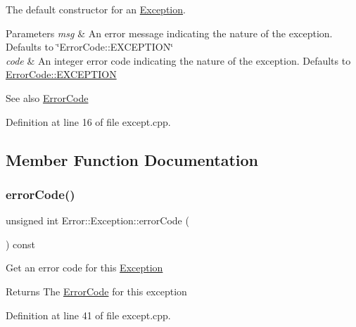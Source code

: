 The default constructor for an \hyperlink{class_error_1_1_exception}{Exception}. 
\begin{DoxyParams}{Parameters}
{\em msg} & An error message indicating the nature of the exception. Defaults to \char`\"{}\+Error\+Code\+::\+E\+X\+C\+E\+P\+T\+I\+O\+N\char`\"{} \\
\hline
{\em code} & An integer error code indicating the nature of the exception. Defaults to \hyperlink{namespace_error_1_1_error_code_ae85b7b550a5a82a4f04d8d5df167f081}{Error\+Code\+::\+E\+X\+C\+E\+P\+T\+I\+ON} \\
\hline
\end{DoxyParams}
\begin{DoxySeeAlso}{See also}
\hyperlink{namespace_error_1_1_error_code}{Error\+Code} 
\end{DoxySeeAlso}


Definition at line 16 of file except.\+cpp.



\subsection{Member Function Documentation}
\hypertarget{class_error_1_1_exception_ad0b9ea65370ae2a2a241fe998ccc6c77}{}\label{class_error_1_1_exception_ad0b9ea65370ae2a2a241fe998ccc6c77} 
\subsubsection{\texorpdfstring{error\+Code()}{errorCode()}\hspace{0.1cm}{\footnotesize\ttfamily [1/2]}}
{\footnotesize\ttfamily unsigned int Error\+::\+Exception\+::error\+Code (\begin{DoxyParamCaption}{ }\end{DoxyParamCaption}) const\hspace{0.3cm}{\ttfamily [virtual]}}

Get an error code for this \hyperlink{class_error_1_1_exception}{Exception} \begin{DoxyReturn}{Returns}
The \hyperlink{namespace_error_1_1_error_code}{Error\+Code} for this exception 
\end{DoxyReturn}


Definition at line 41 of file except.\+cpp.

\hypertarget{class_error_1_1_exception_a90ee3eaa75cc09bd7d0d1e843076f9a2}{}\label{class_error_1_1_exception_a90ee3eaa75cc09bd7d0d1e843076f9a2} 
